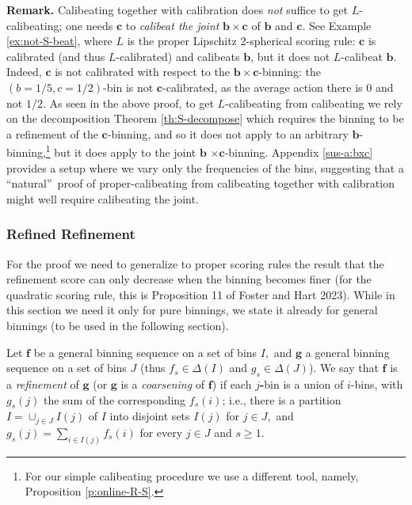 \documentclass[12pt,a4paper,notitlepage]{article}
\begin{document}
\bigskip

\noindent \textbf{Remark. }Calibeating together with calibration does \emph{%
not} suffice to get $L$-calibeating; one needs $\mathbf{c}$ to \emph{%
calibeat the joint} $\mathbf{b}\times \mathbf{c}$ of $\mathbf{b}$ and $%
\mathbf{c}$. See Example \ref{ex:not-S-beat}, where $L$ is the proper
Lipschitz $2$-spherical scoring rule: $\mathbf{c}$ is calibrated (and thus $%
L $-calibrated) and calibeats $\mathbf{b}$, but it does not $L$-calibeat $%
\mathbf{b}$. Indeed, $\mathbf{c}$ is not calibrated with respect to the $%
\mathbf{b}\times \mathbf{c}$-binning: the $(b=1/5,c=1/2)$-bin is not $%
\mathbf{c}$-calibrated, as the average action there is $0$ and not $1/2$. As
seen in the above proof, to get $L$-calibeating from calibeating we rely on
the decomposition Theorem \ref{th:S-decompose} which requires the binning to
be a refinement of the $\mathbf{c}$-binning, and so it does not apply to an
arbitrary $\mathbf{b}$-binning,\footnote{%
For our simple calibeating procedure we use a different tool, namely,
Proposition \ref{p:online-R-S}.} but it does apply to the joint $\mathbf{b}$%
\textbf{$\times $}$\mathbf{c}$-binning. Appendix \ref{sus-a:bxc} provides a
setup where we vary only the frequencies of the bins, suggesting that a
\textquotedblleft natural\textquotedblright\ proof of proper-calibeating
from calibeating together with calibration might well require calibeating
the joint.

\subsubsection{Refined Refinement\label{susus:refined refinement}}

For the proof we need to generalize to proper scoring rules the result that
the refinement score can only decrease when the binning becomes finer (for
the quadratic scoring rule, this is Proposition 11 of Foster and Hart 2023).
While in this section we need it only for pure binnings, we state it already
for general binnings (to be used in the following section).

Let $\mathbf{f}$ be a general binning sequence on a set of bins $I,$ and $%
\mathbf{g}$ a general binning sequence on a set of bins $J$ (thus $f_{s}\in
\Delta (I)$ and $g_{s}\in \Delta (J)$). We say that $\mathbf{f}$ is a \emph{%
refinement} of $\mathbf{g}$ (or $\mathbf{g}$ is a \emph{coarsening} of $%
\mathbf{f}$) if each $j$\textbf{-}bin is a union of $i$-bins, with $g_{s}(j)$
the sum of the corresponding $f_{s}(i)$; i.e., there is a partition $I=\cup
_{j\in J}I(j)$ of $I$ into disjoint sets $I(j)$ for $j\in J,$ and $%
g_{s}(j)=\sum_{i\in I(j)}f_{s}(i)$ for every $j\in J$ and $s\geq 1$.
\end{document}
